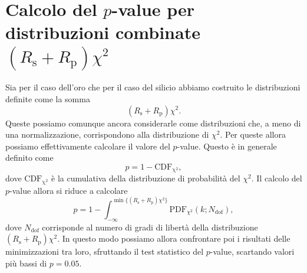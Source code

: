 \documentclass[
    prb,altaffilletter,citeautoscript,
    amsmath,amssymb,
    showpacs,showkeys,floatfix,
    reprint
]{revtex4-1}
\begin{document}
\section{Calcolo del $p$-value per distribuzioni combinate $(R_\mathrm{s}+R_\mathrm{p})\chi^2$}\label{sec:C}

Sia per il caso dell'oro che per il caso del silicio abbiamo costruito le distribuzioni definite come la somma \[(R_\mathrm{s} + R_\mathrm{p})\chi^2.\] Queste possiamo comunque ancora considerarle come distribuzioni che, a meno di una normalizzazione, corrispondono alla distribuzione di $\chi^2$. Per queste allora possiamo effettivamente calcolare il valore del $p$-value. Questo è in generale definito come \begin{equation}
    p = 1-\mathrm{CDF_{\chi^2}},
\end{equation} dove $\mathrm{CDF_{\chi^2}}$ è la cumulativa della distribuzione di probabilità del $\chi^2$\cite{ahrensLancasterChisquaredDistribution1971}. Il calcolo del $p$-value allora si riduce a calcolare \begin{equation}
    p=1-\int_{-\infty}^{\min\{(R_\mathrm{s}+R_\mathrm{p})\chi^2\}} \mathrm{PDF}_{\chi^2} (k; N_\mathrm{dof}),
\end{equation} dove $N_\mathrm{dof}$ corrisponde al numero di gradi di libertà della distribuzione $(R_\mathrm{s}+R_\mathrm{p})\chi^2$. In questo modo possiamo allora confrontare poi i risultati delle minimizzazioni tra loro, sfruttando il test statistico del $p$-value, scartando valori più bassi di $p=0.05$.
\end{document}
